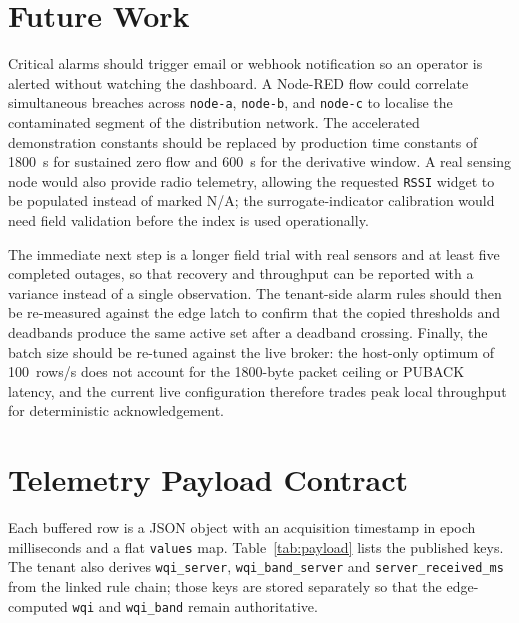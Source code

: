 \documentclass[conference]{IEEEtran}
\begin{document}
\section{Future Work}
\label{sec:future}

Critical alarms should trigger email or webhook notification so an operator is alerted
without watching the dashboard. A Node-RED flow could correlate simultaneous breaches
across \texttt{node-a}, \texttt{node-b}, and \texttt{node-c} to localise the contaminated
segment of the distribution network. The accelerated demonstration constants should be
replaced by production time constants of 1800~s for sustained zero flow and 600~s for
the derivative window. A real sensing node would also provide radio telemetry, allowing
the requested \texttt{RSSI} widget to be populated instead of marked N/A; the
surrogate-indicator calibration would need field validation before the index is used
operationally.

The immediate next step is a longer field trial with real sensors and at least
five completed outages, so that recovery and throughput can be reported with a
variance instead of a single observation. The tenant-side alarm rules should then
be re-measured against the edge latch to confirm that the copied thresholds and
deadbands produce the same active set after a deadband crossing. Finally, the
batch size should be re-tuned against the live broker: the host-only optimum of
100~rows/s does not account for the 1800-byte packet ceiling or PUBACK latency,
and the current live configuration therefore trades peak local throughput for
deterministic acknowledgement.

\appendices{}

\section{Telemetry Payload Contract}
\label{app:payload}

Each buffered row is a JSON object with an acquisition timestamp in epoch
milliseconds and a flat \texttt{values} map. Table~\ref{tab:payload} lists the
published keys. The tenant also derives \texttt{wqi\_server},
\texttt{wqi\_band\_server} and \texttt{server\_received\_ms} from the linked rule
chain; those keys are stored separately so that the edge-computed
\texttt{wqi} and \texttt{wqi\_band} remain authoritative.
\end{document}
